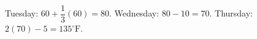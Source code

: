 Tuesday: $60+\dfrac{1}{3}(60)=80$. Wednesday: $80-10=70$. Thursday: $2(70)-5=\boxed{135^\circ\mathrm F}$.
